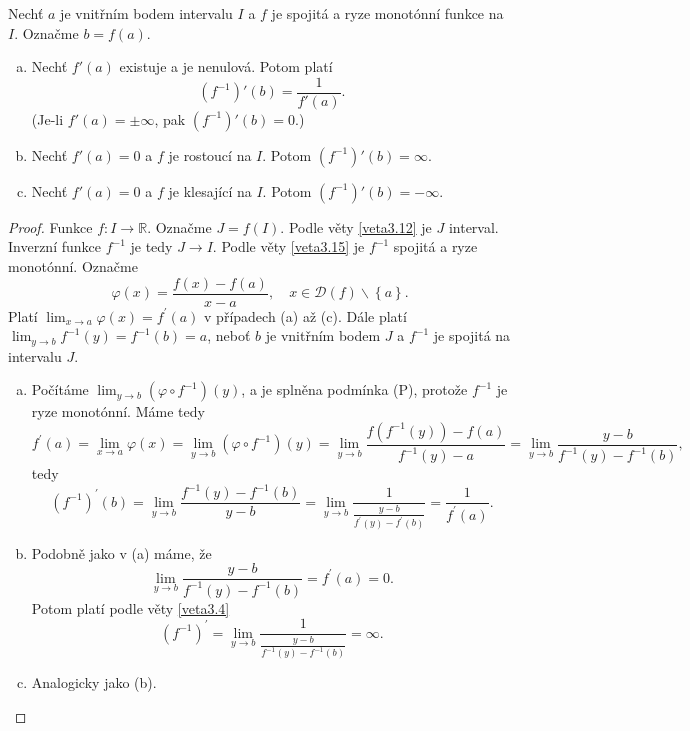 \begin{veta} \label{veta5.4}
Nechť $a$ je vnitřním bodem intervalu $I$ a $f$ je spojitá a ryze monotónní funkce na $I$. Označme $b=f(a)$.
\begin{enumerate}[(a)]
  \item Nechť $f'(a)$ existuje a je nenulová. Potom platí
  $$(f^{-1})'(b)=\dfrac{1}{f'(a)}.$$
  (Je-li $f'(a)=\pm\infty$, pak $(f^{-1})'(b)=0$.)
  \item Nechť $f'(a)=0$ a $f$ je rostoucí na $I$. Potom $(f^{-1})'(b)=\infty$.
  \item Nechť $f'(a)=0$ a $f$ je klesající na $I$. Potom $(f^{-1})'(b)=-\infty$.
\end{enumerate}
\end{veta}

\begin{proof}
	Funkce $f:I\to \mathbb R $. Označme $J=f(I)$. Podle věty \ref{veta3.12} je $J$ interval.
	Inverzní funkce $f^{-1}$ je tedy $J\to I$. Podle věty \ref{veta3.15} je $f^{-1}$ spojitá
	a ryze monotónní. Označme
	$$
	    \varphi(x) = \frac{f(x)-f(a)}{x-a}, \quad x \in \mathcal D(f)\smallsetminus \left \{ a \right \}.
	$$
	Platí $\lim_{x\to a} \varphi(x)=f^\prime(a)$ v případech (a) až (c). Dále platí
	$\lim_{y\to b} f^{-1}(y)=f^{-1}(b)=a$, neboť $b$ je vnitřním bodem $J$ a $f^{-1}$ je spojitá
	na intervalu $J$.
	\begin{enumerate}[(a)]
		\item Počítáme $\lim_{y\to b} (\varphi \circ f^{-1})(y)$, a je splněna podmínka (P), protože
		$f^{-1}$ je ryze monotónní. Máme tedy
		$$
  f^\prime(a)=\lim_{x\to a}\varphi(x)=\lim_{y\to b} (\varphi \circ f^{-1})(y)=\lim_{y\to b} \frac{f(f^{-1}(y))-f(a)}{f^{-1}(y)-a} = \lim_{y\to b} \frac{y-b}{f^{-1}(y)-f^{-1}(b)},
		$$
		tedy
		$$
		    (f^{-1})^\prime(b) = \lim_{y\to b} \frac{f^{-1}(y)-f^{-1}(b)}{y-b} = \lim_{y\to b} \frac{1}{\frac{y-b}{f^\prime(y)-f^\prime(b)}}=\frac{1}{f^\prime(a)}.
		$$
		\item Podobně jako v (a) máme, že
		$$\lim_{y\to b} \frac{y-b}{f^{-1}(y)-f^{-1}(b)}=f^\prime (a) = 0.$$
		Potom platí podle věty \ref{veta3.4}
		$$
		    (f^{-1})^\prime = \lim_{y\to b} \frac{1}{\frac{y-b}{f^{-1}(y)-f^{-1}(b)}}=\infty.
		$$
		\item Analogicky jako (b).\qedhere
	\end{enumerate}
\end{proof}


